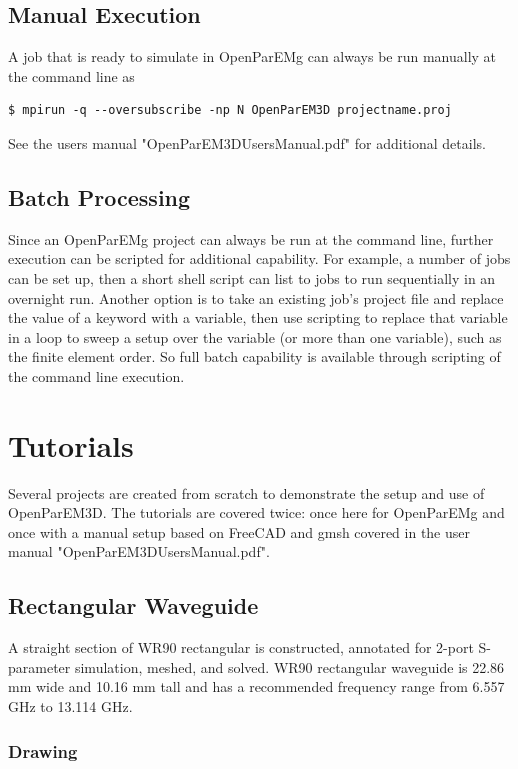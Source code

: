 \documentclass[titlepage]{article}
\renewcommand\_{\textunderscore\linebreak[1]}
\begin{document}
\subsection{Manual Execution}

A job that is ready to simulate in OpenParEMg can always be run manually at the command line as
\begin{Verbatim}[fontsize=\small]
   $ mpirun -q --oversubscribe -np N OpenParEM3D projectname.proj
\end{Verbatim}
See the users manual "OpenParEM3D\_Users\_Manual.pdf" for additional details.

\subsection{Batch Processing}

Since an OpenParEMg project can always be run at the command line, 
further execution can be scripted for additional capability.  For example, a number of jobs can be set up, then a short shell script can list to jobs to run sequentially in an overnight run.  Another option is to take an existing job's project file and replace the value of a keyword with a variable, then use scripting to replace that variable in a loop to sweep a setup over the variable (or more than one variable), such as the finite element order.  So full batch capability is available through scripting of the command line execution.


\section{Tutorials}
\label{sec:tutorials}

Several projects are created from scratch to demonstrate the setup and use of OpenParEM3D.  The tutorials are covered twice: once here for OpenParEMg and once with a manual setup based on FreeCAD and gmsh covered in the  user manual "OpenParEM3D\_Users\_Manual.pdf".

\subsection{Rectangular Waveguide}
A straight section of WR90 rectangular is constructed, annotated for 2-port S-parameter simulation, meshed, and solved.  WR90 rectangular waveguide is 22.86 mm wide and 10.16 mm tall and has a recommended frequency range from 6.557 GHz to 13.114 GHz.

\subsubsection{Drawing}
\end{document}
